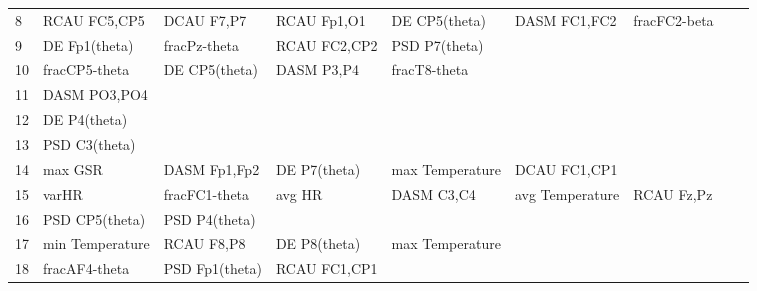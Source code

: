 \begin{landscape}
\begin{table}[]
\begin{tabular}{l|llllllll}
8                  & RCAU FC5,CP5         & DCAU F7,P7              & RCAU Fp1,O1          & DE CP5(theta)      & DASM FC1,FC2          & fracFC2-beta         &                 &                 \\
9                  & DE Fp1(theta)        & fracPz-theta            & RCAU FC2,CP2         & PSD P7(theta)      &                       &                      &                 &                 \\
10                 & fracCP5-theta        & DE CP5(theta)           & DASM P3,P4           & fracT8-theta       &                       &                      &                 &                 \\
11                 & DASM PO3,PO4         &                         &                      &                    &                       &                      &                 &                 \\
12                 & DE P4(theta)         &                         &                      &                    &                       &                      &                 &                 \\
13                 & PSD C3(theta)        &                         &                      &                    &                       &                      &                 &                 \\
14                 & max GSR              & DASM Fp1,Fp2            & DE P7(theta)         & max Temperature    & DCAU FC1,CP1          &                      &                 &                 \\
15                 & varHR                & fracFC1-theta           & avg HR               & DASM C3,C4         & avg Temperature       & RCAU Fz,Pz           &                 &                 \\
16                 & PSD CP5(theta)       & PSD P4(theta)           &                      &                    &                       &                      &                 &                 \\
17                 & min Temperature      & RCAU F8,P8              & DE P8(theta)         & max Temperature    &                       &                      &                 &                 \\
18                 & fracAF4-theta        & PSD Fp1(theta)          & RCAU FC1,CP1         &                    &                       &                      &                 &                 \\

\end{tabular}
\end{table}
\end{landscape}
